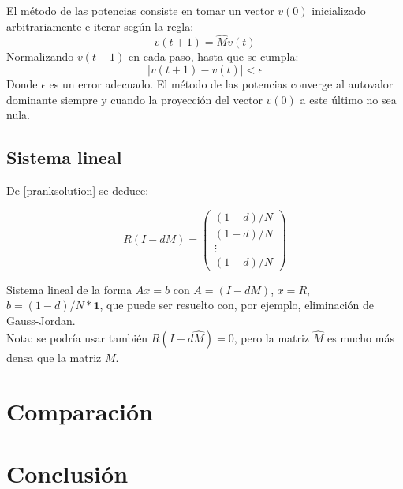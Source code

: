 \documentclass[%
    final,
    notitlepage,
    narroweqnarray,
    inline,
    twoside,
    invited
    ]{ieee}
\begin{document}
El método de las potencias
consiste en tomar un vector $v(0)$ inicializado
arbitrariamente e iterar según la regla:
\begin{equation}
v(t+1) = \widehat{M}v(t)
\end{equation}
Normalizando $v(t+1)$ en cada paso, hasta que se cumpla:
\begin{equation}
\left| v(t+1) - v(t) \right| < \epsilon
\end{equation}
Donde $\epsilon$ es un error adecuado. El método de las potencias converge al autovalor dominante siempre y cuando la proyección del vector $v(0)$ a este
último no sea nula.

\subsection{Sistema lineal}

De \eqref{pranksolution} se deduce:

\begin{equation}
    R (I - dM) = \begin{pmatrix}
                     (1-d)/N \\ (1-d)/N \\ \vdots \\ (1-d)/N
                 \end{pmatrix}
\end{equation}

Sistema lineal de la forma $Ax = b$ con $A = (I - dM)$, $x = R$, $b = (1-d)/N* \mathbf 1$, que puede ser resuelto con, por ejemplo, eliminación de Gauss-Jordan.\\

Nota: se podría usar también $R(I-d\widehat{M}) = 0$, pero la matriz $\widehat{M}$ es mucho más densa que la matriz $M$.

\section{Comparación}


\section{Conclusión}

\end{document}
